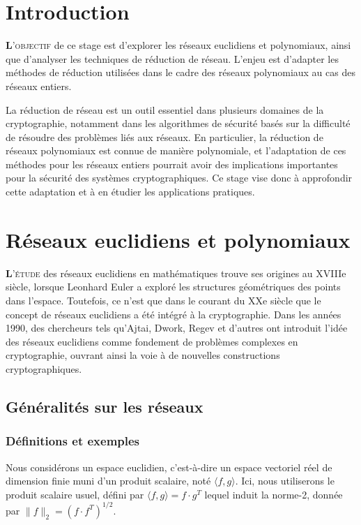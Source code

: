 \documentclass[a4paper,12pt]{report}  %
\theoremstyle{definitionstyle}
\theoremstyle{examplestyle}
\theoremstyle{remarkstyle}
\theoremstyle{propositionstyle}
\theoremstyle{theoremstyle}
\theoremstyle{proofstyle}
\begin{document}
	
	\chapter*{Introduction}
	
	\lettrine{\textbf{L}}{'objectif} de ce stage est d'explorer les réseaux euclidiens et polynomiaux, ainsi que d'analyser les techniques de réduction de réseau. L'enjeu est d'adapter les méthodes de réduction utilisées dans le cadre des réseaux polynomiaux au cas des réseaux entiers.
	
	La réduction de réseau est un outil essentiel dans plusieurs domaines de la cryptographie, notamment dans les algorithmes de sécurité basés sur la difficulté de résoudre des problèmes liés aux réseaux. En particulier, la réduction de réseaux polynomiaux est connue de manière polynomiale, et l'adaptation de ces méthodes pour les réseaux entiers pourrait avoir des implications importantes pour la sécurité des systèmes cryptographiques. Ce stage vise donc à approfondir cette adaptation et à en étudier les applications pratiques.	
	
	\chapter{Réseaux euclidiens et polynomiaux}
	
	\lettrine{\textbf{L}}{'étude} des réseaux euclidiens en mathématiques trouve ses origines au XVIIIe siècle, lorsque Leonhard Euler a exploré les structures géométriques des points dans l'espace. Toutefois, ce n'est que dans le courant du XXe siècle que le concept de réseaux euclidiens a été intégré à la cryptographie. Dans les années 1990, des chercheurs tels qu'Ajtai, Dwork, Regev et d'autres ont introduit l'idée des réseaux euclidiens comme fondement de problèmes complexes en cryptographie, ouvrant ainsi la voie à de nouvelles constructions cryptographiques.
	
	\section{Généralités sur les réseaux}
	
	
	\subsection{Définitions et exemples}
	Nous considérons un espace euclidien, c'est-à-dire un espace vectoriel réel de dimension finie muni d'un produit scalaire, noté $\langle f, g \rangle$. Ici, nous utiliserons le produit scalaire usuel, défini par $\langle f, g \rangle = f \cdot g^T$ lequel induit la norme-2, donnée par $\|f\|_2=(f \cdot f^T)^{1/2}$.
	
\end{document}
